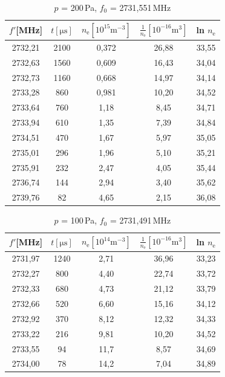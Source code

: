 \documentclass[12pt]{article}
\begin{document}
\begin{table}[htbp]
\begin{center}
\begin{tabular}{|c|c|c|c|c|}
\hline
$f'$[MHz] & $t[\mathrm{\mu s}]$ & $n_\mathrm{e}[10^{15}\mathrm{m}^{-3}]$ & $\frac{1}{n_\mathrm{e}} [10^{-16} \mathrm{m}^3]$ & ln $n_\mathrm{e}$ \\ \hline
2732,21 & 2100 & 0,372 & 26,88 & 33,55 \\ \hline
2732,63 & 1560 & 0,609 & 16,43 & 34,04 \\ \hline
2732,73 & 1160 & 0,668 & 14,97 & 34,14 \\ \hline
2733,28 & 860 & 0,981 & 10,20 & 34,52 \\ \hline
2733,64 & 760 & 1,18 & 8,45 & 34,71 \\ \hline
2733,94 & 610 & 1,35 & 7,39 & 34,84 \\ \hline
2734,51 & 470 & 1,67 & 5,97 & 35,05 \\ \hline
2735,01 & 296 & 1,96 & 5,10 & 35,21 \\ \hline
2735,91 & 232 & 2,47 & 4,05 & 35,44 \\ \hline
2736,74 & 144 & 2,94 & 3,40 & 35,62 \\ \hline
2739,76 & 82 & 4,65 & 2,15 & 36,08 \\ \hline
\end{tabular}
\caption{$p$ = 200\,Pa, $f_0$ = 2731,551\,MHz}
\label{p200}
\end{center}
\end{table}

\begin{table}[htbp]
\begin{center}
\begin{tabular}{|c|c|c|c|c|}
\hline
$f'$[MHz] & $t[\mathrm{\mu s}]$ & $n_\mathrm{e}[10^{14}\mathrm{m}^{-3}]$ & $\frac{1}{n_\mathrm{e}} [10^{-16} \mathrm{m}^3]$ & ln $n_\mathrm{e}$ \\ \hline
2731,97 & 1240 & 2,71 & 36,96 & 33,23 \\ \hline
2732,27 & 800 & 4,40 & 22,74 & 33,72 \\ \hline
2732,33 & 680 & 4,73 & 21,12 & 33,79 \\ \hline
2732,66 & 520 & 6,60 & 15,16 & 34,12 \\ \hline
2732,92 & 370 & 8,12 & 12,32 & 34,33 \\ \hline
2733,22 & 216 & 9,81 & 10,20 & 34,52 \\ \hline
2733,55 & 94 & 11,7 & 8,57 & 34,69 \\ \hline
2734,00 & 78 & 14,2 & 7,04 & 34,89 \\ \hline
\end{tabular}
\caption{$p$ = 100\,Pa, $f_0$ = 2731,491\,MHz}
\label{p100}
\end{center}
\end{table}
\end{document}
